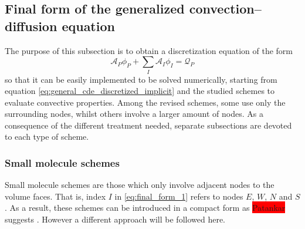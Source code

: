 
\subsection{Final form of the generalized convection--diffusion equation}

The purpose of this subsection is to obtain a discretization equation of the form
\begin{equation} \label{eq:final_form_1}
	\mathcal{A}_P \phi_P + \sum_I \mathcal{A}_I \phi_I = \mathcal{Q}_P
\end{equation}
so that it can be easily implemented to be solved numerically, starting from equation \eqref{eq:general_cde_discretized_implicit} and the studied schemes to evaluate convective properties. Among the revised schemes, some use only the surrounding nodes, whilst others involve a larger amount of nodes. As a consequence of the different treatment needed, separate subsections are devoted to each type of scheme.

\subsubsection{Small molecule schemes}

Small molecule schemes are those which only involve adjacent nodes to the volume faces. That is, index $I$ in \eqref{eq:final_form_1} refers to nodes $E$, $W$, $N$ and $S$. As a result, these schemes can be introduced in a compact form as \colorbox{red}{Patankar} suggests \cite{patankar2008numerical}. However a different approach will be followed here. 

